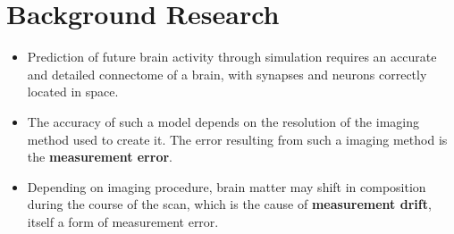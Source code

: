 \chapter{Background Research}

\begin{itemize}
    \item Prediction of future brain activity through simulation requires an accurate and detailed connectome of a brain, with synapses and neurons correctly located in space.\parencite{bostrom_whole_2008}
    \item The accuracy of such a model depends on the resolution of the imaging method used to create it. The error resulting from such a imaging method is the \textbf{measurement error}.
    \item Depending on imaging procedure, brain matter may shift in composition during the course of the scan, which is the cause of \textbf{measurement drift}, itself a form of measurement error.
\end{itemize}



